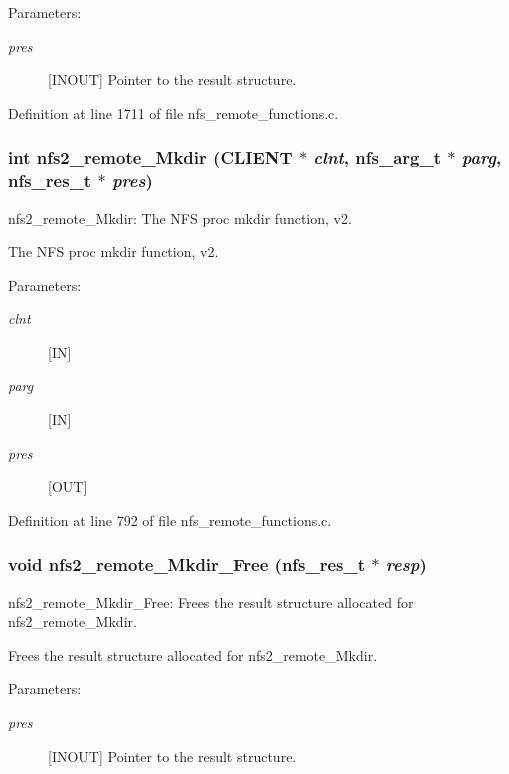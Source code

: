 \begin{Desc}
\item[Parameters:]
\begin{description}
\item[{\em pres}][INOUT] Pointer to the result structure. \end{description}
\end{Desc}


Definition at line 1711 of file nfs\_\-remote\_\-functions.c.
\subsubsection{\setlength{\rightskip}{0pt plus 5cm}int nfs2\_\-remote\_\-Mkdir (CLIENT $\ast$ {\em clnt}, nfs\_\-arg\_\-t $\ast$ {\em parg}, nfs\_\-res\_\-t $\ast$ {\em pres})}\label{group__NFSprocs_ga14}


nfs2\_\-remote\_\-Mkdir: The NFS proc mkdir function, v2.

The NFS proc mkdir function, v2.

\begin{Desc}
\item[Parameters:]
\begin{description}
\item[{\em clnt}][IN] \item[{\em parg}][IN] \item[{\em pres}][OUT] \end{description}
\end{Desc}


Definition at line 792 of file nfs\_\-remote\_\-functions.c.
\subsubsection{\setlength{\rightskip}{0pt plus 5cm}void nfs2\_\-remote\_\-Mkdir\_\-Free (nfs\_\-res\_\-t $\ast$ {\em resp})}\label{group__NFSprocs_ga61}


nfs2\_\-remote\_\-Mkdir\_\-Free: Frees the result structure allocated for nfs2\_\-remote\_\-Mkdir.

Frees the result structure allocated for nfs2\_\-remote\_\-Mkdir.

\begin{Desc}
\item[Parameters:]
\begin{description}
\item[{\em pres}][INOUT] Pointer to the result structure. \end{description}
\end{Desc}



